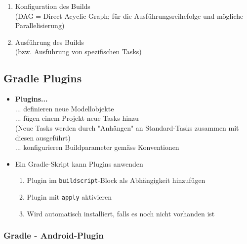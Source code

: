 \documentclass[a4paper]{article}
\begin{document}
{\begin{itemize}
\begin{enumerate}
			\item Konfiguration des Builds \\
					(DAG = Direct Acyclic Graph; für die Ausführungsreihefolge und mögliche Parallelisierung)
					
			\item Ausführung des Builds \\
					(bzw. Ausführung von spezifischen Tasks)
			
		\end{enumerate}
		
	\end{itemize}
	
	\subsection{Gradle Plugins}
	
	\begin{itemize}
		
		\item \textbf{Plugins...}\\
				... definieren neue Modellobjekte\\
				... fügen einem Projekt neue Tasks hinzu \\
					\quad(Neue Tasks werden durch "Anhängen" an Standard-Tasks zusammen mit diesen ausgeführt)\\
				... konfigurieren Buildparameter gemäss Konventionen
				
		\item Ein Gradle-Skript kann Plugins anwenden
		\begin{enumerate}
			
			\item Plugin im \texttt{buildscript}-Block als Abhängigkeit hinzufügen
			
			\item Plugin mit \texttt{apply} aktivieren
			
			\item Wird automatisch installiert, falls es noch nicht vorhanden ist
			
		\end{enumerate}	
		
	\end{itemize}

		\subsubsection{Gradle - Android-Plugin}
		
		\begin{itemize}
			

\end{itemize}}
\end{document}
